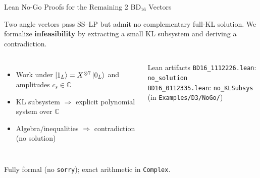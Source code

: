 \documentclass[aspectratio=169,t,10pt]{beamer}
\newcommand{\CC}{\mathbb{C}}
\newcommand{\code}[1]{\texttt{\small #1}}
\begin{document}
\begin{frame}{Lean No-Go Proofs for the Remaining 2 BD$_{16}$ Vectors}

\small
Two angle vectors pass SS--LP but admit \alert{no} complementary full-KL solution.
We formalize \textbf{infeasibility} by extracting a small KL subsystem and deriving a contradiction.

\begin{columns}[T]
\begin{itemize}\setlength\itemsep{1pt}
\item Work under $\ket{1_L}=X^{\otimes 7}\ket{0_L}$ and amplitudes $c_s\in\CC$
\item KL subsystem $\Rightarrow$ explicit polynomial system over $\CC$
\item Algebra/inequalities $\Rightarrow$ contradiction (no solution)
\end{itemize}

\begin{exampleblock}{Lean artifacts}
\footnotesize
\code{BD16\_1112226.lean}: \code{no\_solution}\\
\code{BD16\_0112335.lean}: \code{no\_KLSubsys}\\
\textcolor{Slate}{\scriptsize (in \code{Examples/D3/NoGo/})}
\end{exampleblock}
\end{columns}

\textcolor{Slate}{\scriptsize Fully formal (no \code{sorry}); exact arithmetic in \code{Complex}.}
\end{frame}
\end{document}
